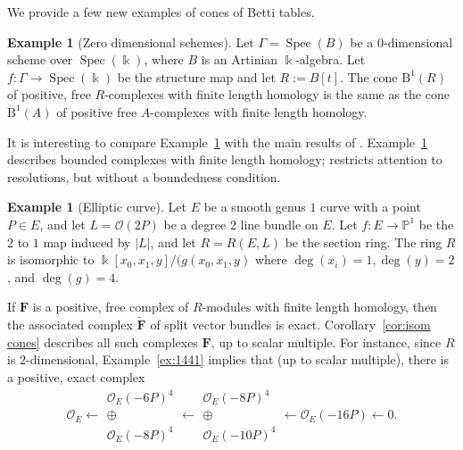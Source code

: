 \documentclass[12pt]{amsart}
\theoremstyle{definition}
\newtheorem{example}[lemma]{Example}
\theoremstyle{remark}
\newcommand{\Spec}{\operatorname{Spec}}
\newcommand{\kk}{\Bbbk}
\newcommand{\PP}{\mathbb{P}}
\newcommand{\cO}{\mathcal{O}}
\newcommand{\FF}{\mathbf{F}}
\newcommand{\BBQ}{\mathrm{B}}
\begin{document}
We provide a few new examples of cones of Betti tables.

\begin{example}[Zero dimensional schemes]\label{ex:zero dim}Let $\Gamma=\Spec(B)$ be a $0$-dimensional scheme over $\Spec(\kk)$, where $B$ is an Artinian $\kk$-algebra.  Let $f\colon \Gamma\to \Spec(\kk)$ be the structure map and let $R:=B[t]$.  The cone $\BBQ^1(R)$ of positive, free $R$-complexes with finite length homology is the same as the cone $\BBQ^1(A)$ of positive free $A$-complexes with finite length homology.  
\end{example}

It is interesting to compare Example~\ref{ex:zero dim} with the main results of \cite{bbeg}.  Example~\ref{ex:zero dim} describes bounded complexes with finite length homology; \cite{bbeg} restricts attention to resolutions, but without a boundedness condition.

\begin{example}[Elliptic curve]
Let $E$ be a smooth genus $1$ curve with a point $P\in E$, and let $L=\cO(2P)$ be a degree $2$ line bundle on $E$.  Let $f\colon E\to \PP^1$ be the $2$ to $1$ map induced by $|L|$, and let $R=R(E,L)$ be the section ring.  The ring $R$ is isomorphic to $\kk[x_0,x_1,y]/(g(x_0,x_1,y)$ where $\deg(x_i)=1,\deg(y)=2$, and $\deg(g)=4$.

If $\FF$ is a positive, free complex of $R$-modules with finite length homology, then the associated complex $\widetilde{\FF}$ of split vector bundles is exact.  Corollary~\ref{cor:isom cones} describes all such complexes $\FF$, up to scalar multiple.
For instance, since $R$ is $2$-dimensional, Example~\ref{ex:1441} implies that (up to scalar multiple), there is a positive, exact complex
\[
\cO_E\longleftarrow \begin{matrix}  \cO_E(-6P)^4\\ \oplus\\ \cO_E(-8P)^4\end{matrix}\longleftarrow \begin{matrix}  \cO_E(-8P)^4\\ \oplus\\ \cO_E(-10P)^4\end{matrix} \longleftarrow \cO_E(-16P)\longleftarrow 0.
\]
\end{example}
\end{document}

